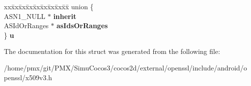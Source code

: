 \begin{DoxyCompactItemize}
\begin{tabbing}
\end{tabbing}\item 
\mbox{\label{structASIdentifierChoice__st_acad34e9eb38f64b93ccf05baf89d0c08}} 
\begin{tabbing}
xx\=xx\=xx\=xx\=xx\=xx\=xx\=xx\=xx\=\kill
union \{\\
\>ASN1\_NULL $\ast$ {\bfseries inherit}\\
\>ASIdOrRanges $\ast$ {\bfseries asIdsOrRanges}\\
\} {\bfseries u}\\

\end{tabbing}\end{DoxyCompactItemize}


The documentation for this struct was generated from the following file\+:\begin{DoxyCompactItemize}
\item 
/home/pmx/git/\+P\+M\+X/\+Simu\+Cocos3/cocos2d/external/openssl/include/android/openssl/x509v3.\+h\end{DoxyCompactItemize}
